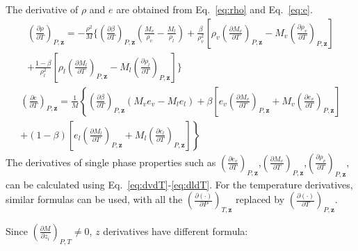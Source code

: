 The derivative of $\rho$ and $e$ are obtained from Eq.~\ref{eq:rho} and Eq.~\ref{eq:e}.
\begin{align}
\left(\frac{\partial \rho}{\partial T} \right)_{P,\mathbf{z}}= 
- \frac{\rho^2}{M}\Bigg\{\left(\frac{\partial \beta}{\partial T}\right)_{P,\mathbf{z}}\left(\frac{M_v}{\rho_v}-\frac{M_l}{\rho_l}\right) + 
\frac{\beta}{\rho_v^2}\left[\rho_v\left(\frac{\partial M_v}{\partial T} \right)_{P,\mathbf{z}}-M_v \left(\frac{\partial \rho_v}{\partial T} \right)_{P,\mathbf{z}}\right] \\+
\frac{1-\beta}{\rho_l^2}\left[\rho_l\left(\frac{\partial M_l}{\partial T} \right)_{P,\mathbf{z}}-M_l \left(\frac{\partial \rho_l}{\partial T} \right)_{P,\mathbf{z}}\right]\Bigg\} 
\end{align}
\begin{align}
\left(\frac{\partial e}{\partial T}\right)_{P,\mathbf{z}}= \frac{1}{M}\left\{ \left(\frac{\partial \beta}{\partial T}\right)_{P,\mathbf{z}} \left(M_v e_v-M_l e_l\right)+\beta \left[e_v\left(\frac{\partial M_v}{\partial T}\right)_{P,\mathbf{z}}+M_v\left(\frac{\partial e_v}{\partial T}\right)_{P,\mathbf{z}}\right]\right.\\ \left.+\left(1-\beta\right)\left[e_l\left(\frac{\partial M_l}{\partial T}\right)_{P,\mathbf{z}}+M_l\left(\frac{\partial e_l}{\partial T}\right)_{P,\mathbf{z}}\right]\right\}
\end{align}
The derivatives of single phase properties such as $\left(\frac{\partial e_v}{\partial T}\right)_{P,\mathbf{z}}$,$\left(\frac{\partial M_v}{\partial T}\right)_{P,\mathbf{z}}$,$\left(\frac{\partial \rho_v}{\partial T} \right)_{P,\mathbf{z}}$, can be calculated using Eq.~\ref{eq:dvdT}-\ref{eq:dldT}. For the temperature derivatives, similar formulas can be used, with all the $\left(\frac{\partial (\cdot)}{\partial P}\right)_{T,\mathbf{z}}$ replaced by $\left(\frac{\partial (\cdot)}{\partial T}\right)_{P,\mathbf{z}}$.

Since  $\left(\frac{\partial M}{\partial z_i}\right)_{P,T} \neq 0 $, $z$ derivatives have different formula: 

